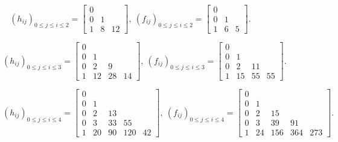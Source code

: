\documentclass[11pt]{amsart}
\theoremstyle{plain}
\numberwithin{lemma}{\DefaultNumberTheoremWithin}
\numberwithin{theorem}{\DefaultNumberTheoremWithin}
\numberwithin{corollary}{\DefaultNumberTheoremWithin}
\numberwithin{proposition}{\DefaultNumberTheoremWithin}
\numberwithin{conjecture}{\DefaultNumberTheoremWithin}
\theoremstyle{definition}
\numberwithin{definition}{\DefaultNumberTheoremWithin}
\numberwithin{question}{\DefaultNumberTheoremWithin}
\numberwithin{problem}{\DefaultNumberTheoremWithin}
\theoremstyle{remark}
\numberwithin{remark}{\DefaultNumberTheoremWithin}
\numberwithin{example}{\DefaultNumberTheoremWithin}
\numberwithin{claim}{\DefaultNumberTheoremWithin}
\begin{document}
\begin{figure}[H]


{\small

$$ (h_{ij})_{0 \leq j \leq i \leq 2} = \left[\begin{array}{ccc}
 0 &    &     \\
  0 & 1  &    \\
  1 & 8  & 12   
  \end{array}\right],\
(f_{ij})_{0 \leq j \leq i \leq 2} = \left[
 \begin{array}{ccccc}
  0 &    &     \\
  0 & 1  &     \\
  1 & 6 & 5   
  \end{array}\right].$$
  


 $$ (h_{ij})_{0 \leq j \leq i \leq 3} = \left[\begin{array}{cccc}
 0 &    &   &  \\
  0 & 1  &  &  \\
  0& 2  & 9 & \\
  1 & 12 & 28 & 14 
  \end{array}\right],\
(f_{ij})_{0 \leq j \leq i \leq 3} = \left[
 \begin{array}{ccccc}
  0 &    &   &  \\
  0 & 1  &   &  \\
  0 & 2  & 11 & \\
  1 & 15 & 55 & 55 
  \end{array}\right].$$


$$ (h_{ij})_{0 \leq j \leq i \leq 4} = \left[\begin{array}{ccccc}
 0 &    &   &  & \\
  0 & 1  &  &  & \\
  0& 2  & 13 & & \\
  0 & 3 & 33 & 55 & \\
  1 & 20 & 90 & 120 & 42
  \end{array}\right],\
(f_{ij})_{0 \leq j \leq i \leq 4} = \left[
 \begin{array}{cccccc}
  0 &    &   &  & \\
  0 & 1  &   &  & \\
  0 & 2  & 15 & & \\
  0& 3 & 39 & 91 & \\
  1 & 24 & 156 & 364 & 273 
  \end{array}\right].$$
 



}
\end{figure}
\end{document}
